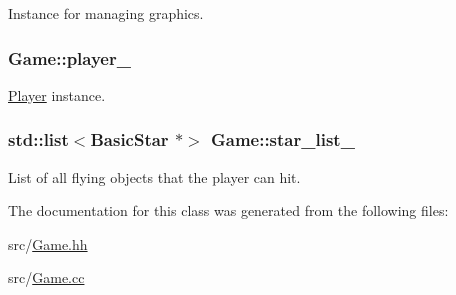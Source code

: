 Instance for managing graphics. 

\hypertarget{classGame_ae152cbdfd498d72b27aaa01a2ed5fe9b}{
\subsubsection[{player\-\_\-}]{ Game\-::player\-\_\-\hspace{0.3cm}{\ttfamily [private]}}}\label{classGame_ae152cbdfd498d72b27aaa01a2ed5fe9b}


\hyperlink{classPlayer}{Player} instance. 

\hypertarget{classGame_a6fa0a46a8891c42b6d57a475e130ee32}{
\subsubsection[{star\-\_\-list\-\_\-}]{\setlength{\rightskip}{0pt plus 5cm}std\-::list$<${\bf Basic\-Star} $\ast$$>$ Game\-::star\-\_\-list\-\_\-\hspace{0.3cm}{\ttfamily [private]}}}\label{classGame_a6fa0a46a8891c42b6d57a475e130ee32}


List of all flying objects that the player can hit. 



The documentation for this class was generated from the following files\-:\begin{DoxyCompactItemize}
\item 
src/\hyperlink{Game_8hh}{Game.\-hh}\item 
src/\hyperlink{Game_8cc}{Game.\-cc}\end{DoxyCompactItemize}
